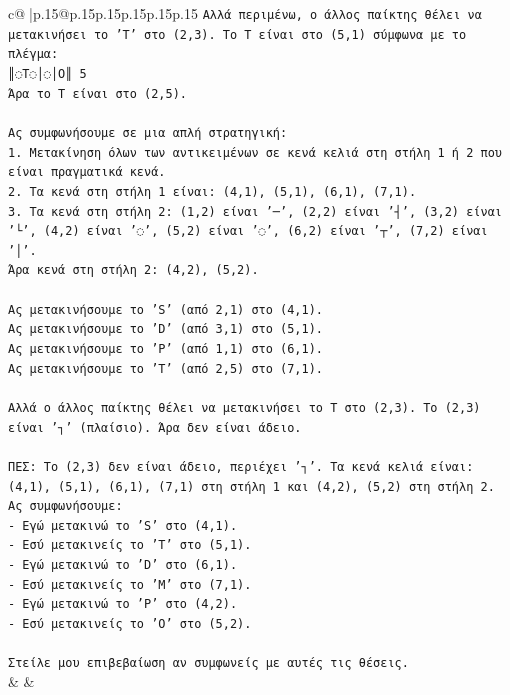 \documentclass{article}
\begin{document}
{\begin{supertabular}{c@{$\;$}|p{.15\linewidth}@{}p{.15\linewidth}p{.15\linewidth}p{.15\linewidth}p{.15\linewidth}p{.15\linewidth}}
{{{\texttt{Αλλά περιμένω, ο άλλος παίκτης θέλει να μετακινήσει το 'T' στο (2,3). Το T είναι στο (5,1) σύμφωνα με το πλέγμα:} \\
\texttt{║◌T◌│◌│O║ 5} \\
\texttt{Άρα το T είναι στο (2,5).} \\
\\ 
\texttt{Ας συμφωνήσουμε σε μια απλή στρατηγική:} \\
\texttt{1. Μετακίνηση όλων των αντικειμένων σε κενά κελιά στη στήλη 1 ή 2 που είναι πραγματικά κενά.} \\
\texttt{2. Τα κενά στη στήλη 1 είναι: (4,1), (5,1), (6,1), (7,1).} \\
\texttt{3. Τα κενά στη στήλη 2: (1,2) είναι '─', (2,2) είναι '┤', (3,2) είναι '└', (4,2) είναι '◌', (5,2) είναι '◌', (6,2) είναι '┬', (7,2) είναι '│'.} \\
\texttt{Άρα κενά στη στήλη 2: (4,2), (5,2).} \\
\\ 
\texttt{Ας μετακινήσουμε το 'S' (από 2,1) στο (4,1).} \\
\texttt{Ας μετακινήσουμε το 'D' (από 3,1) στο (5,1).} \\
\texttt{Ας μετακινήσουμε το 'P' (από 1,1) στο (6,1).} \\
\texttt{Ας μετακινήσουμε το 'T' (από 2,5) στο (7,1).} \\
\\ 
\texttt{Αλλά ο άλλος παίκτης θέλει να μετακινήσει το T στο (2,3). Το (2,3) είναι '┐' (πλαίσιο). Άρα δεν είναι άδειο.} \\
\\ 
\texttt{ΠΕΣ: Το (2,3) δεν είναι άδειο, περιέχει '┐'. Τα κενά κελιά είναι: (4,1), (5,1), (6,1), (7,1) στη στήλη 1 και (4,2), (5,2) στη στήλη 2.} \\
\texttt{Ας συμφωνήσουμε:} \\
\texttt{{-} Εγώ μετακινώ το 'S' στο (4,1).} \\
\texttt{{-} Εσύ μετακινείς το 'T' στο (5,1).} \\
\texttt{{-} Εγώ μετακινώ το 'D' στο (6,1).} \\
\texttt{{-} Εσύ μετακινείς το 'M' στο (7,1).} \\
\texttt{{-} Εγώ μετακινώ το 'P' στο (4,2).} \\
\texttt{{-} Εσύ μετακινείς το 'O' στο (5,2).} \\
\\ 
\texttt{Στείλε μου επιβεβαίωση αν συμφωνείς με αυτές τις θέσεις.} \\
            }
        }
    }
    & & \\ \\


\end{supertabular}}
\end{document}
